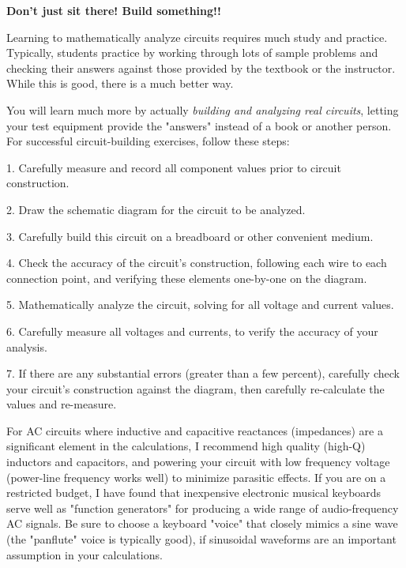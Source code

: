 

\centerline{\bf Don't just sit there!  Build something!!}

\vskip 10pt

Learning to mathematically analyze circuits requires much study and practice.  Typically, students practice by working through lots of sample problems and checking their answers against those provided by the textbook or the instructor.  While this is good, there is a much better way.

You will learn much more by actually {\it building and analyzing real circuits}, letting your test equipment provide the "answers" instead of a book or another person.  For successful circuit-building exercises, follow these steps:

\medskip
\item{1.} Carefully measure and record all component values prior to circuit construction.
\item{2.} Draw the schematic diagram for the circuit to be analyzed.
\item{3.} Carefully build this circuit on a breadboard or other convenient medium.
\item{4.} Check the accuracy of the circuit's construction, following each wire to each connection point, and verifying these elements one-by-one on the diagram.
\item{5.} Mathematically analyze the circuit, solving for all voltage and current values.
\item{6.} Carefully measure all voltages and currents, to verify the accuracy of your analysis.
\item{7.} If there are any substantial errors (greater than a few percent), carefully check your circuit's construction against the diagram, then carefully re-calculate the values and re-measure.
\medskip

For AC circuits where inductive and capacitive reactances (impedances) are a significant element in the calculations, I recommend high quality (high-Q) inductors and capacitors, and powering your circuit with low frequency voltage (power-line frequency works well) to minimize parasitic effects.  If you are on a restricted budget, I have found that inexpensive electronic musical keyboards serve well as "function generators" for producing a wide range of audio-frequency AC signals.  Be sure to choose a keyboard "voice" that closely mimics a sine wave (the "panflute" voice is typically good), if sinusoidal waveforms are an important assumption in your calculations.

